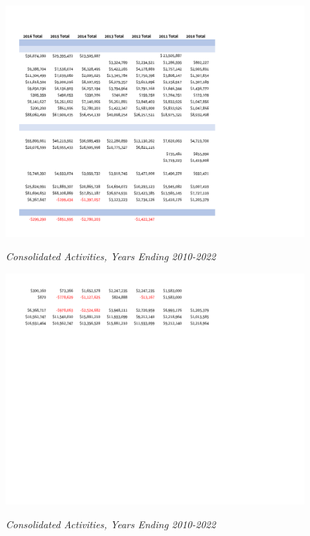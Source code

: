 \begin{figure}[hbt]
    \caption[Consolidated Activities, Years Ending 2010–2022]{\textit{Consolidated Activities, Years Ending 2010-2022}}\label{fig:consolidated_activities_2010-2022} %
    \includegraphics[width=\textwidth]{Consolidated Financial Statements/v5 Spreadsheets/Consolidated_Activities_Years_2010-2022 PDF pages/.pg_0003}\\ %
\end{figure}
\begin{figure}[hbt]
    \caption[Consolidated Activities, Years Ending 2010–2022]{\textit{Consolidated Activities, Years Ending 2010-2022}}\label{fig:consolidated_activities_2010-2022} %
    \includegraphics[width=\textwidth]{Consolidated Financial Statements/v5 Spreadsheets/Consolidated_Activities_Years_2010-2022 PDF pages/.pg_0004}\\ %
\end{figure}

